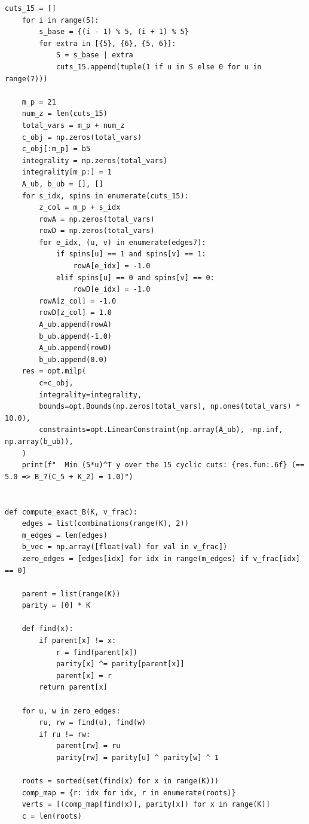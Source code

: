 \documentclass[11pt,a4paper]{ctexart}
\theoremstyle{definition}
\newcommand{\1}{\boldsymbol 1}
\newcommand{\0}{\boldsymbol 0}
\begin{document}
\begin{lstlisting}[style=pycode,caption={$K_{\min}=9$ 充要性定理、10 割/15 割解析下界与极点轨道的精确验证脚本（\texttt{Bgraph\_Kmin\_9\_exact\_verify.py}）}]
    cuts_15 = []
    for i in range(5):
        s_base = {(i - 1) % 5, (i + 1) % 5}
        for extra in [{5}, {6}, {5, 6}]:
            S = s_base | extra
            cuts_15.append(tuple(1 if u in S else 0 for u in range(7)))

    m_p = 21
    num_z = len(cuts_15)
    total_vars = m_p + num_z
    c_obj = np.zeros(total_vars)
    c_obj[:m_p] = b5
    integrality = np.zeros(total_vars)
    integrality[m_p:] = 1
    A_ub, b_ub = [], []
    for s_idx, spins in enumerate(cuts_15):
        z_col = m_p + s_idx
        rowA = np.zeros(total_vars)
        rowD = np.zeros(total_vars)
        for e_idx, (u, v) in enumerate(edges7):
            if spins[u] == 1 and spins[v] == 1:
                rowA[e_idx] = -1.0
            elif spins[u] == 0 and spins[v] == 0:
                rowD[e_idx] = -1.0
        rowA[z_col] = -1.0
        rowD[z_col] = 1.0
        A_ub.append(rowA)
        b_ub.append(-1.0)
        A_ub.append(rowD)
        b_ub.append(0.0)
    res = opt.milp(
        c=c_obj,
        integrality=integrality,
        bounds=opt.Bounds(np.zeros(total_vars), np.ones(total_vars) * 10.0),
        constraints=opt.LinearConstraint(np.array(A_ub), -np.inf, np.array(b_ub)),
    )
    print(f"  Min (5*u)^T y over the 15 cyclic cuts: {res.fun:.6f} (== 5.0 => B_7(C_5 + K_2) = 1.0)")


def compute_exact_B(K, v_frac):
    edges = list(combinations(range(K), 2))
    m_edges = len(edges)
    b_vec = np.array([float(val) for val in v_frac])
    zero_edges = [edges[idx] for idx in range(m_edges) if v_frac[idx] == 0]

    parent = list(range(K))
    parity = [0] * K

    def find(x):
        if parent[x] != x:
            r = find(parent[x])
            parity[x] ^= parity[parent[x]]
            parent[x] = r
        return parent[x]

    for u, w in zero_edges:
        ru, rw = find(u), find(w)
        if ru != rw:
            parent[rw] = ru
            parity[rw] = parity[u] ^ parity[w] ^ 1

    roots = sorted(set(find(x) for x in range(K)))
    comp_map = {r: idx for idx, r in enumerate(roots)}
    verts = [(comp_map[find(x)], parity[x]) for x in range(K)]
    c = len(roots)


\end{lstlisting}
\end{document}
